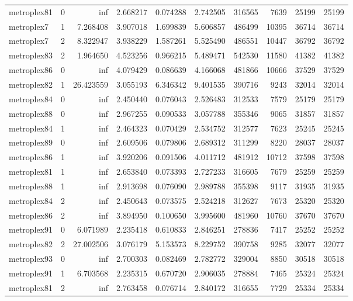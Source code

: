 \begin{longtable}{|l|r|r|r|r|r|r|r|r|r|}
metroplex81 & 0 & inf & 2.668217 & 0.074288 & 2.742505 & 316565 & 7639 & 25199 & 25199 \\
metroplex7 & 1 & 7.268408 & 3.907018 & 1.699839 & 5.606857 & 486499 & 10395 & 36714 & 36714 \\
metroplex7 & 2 & 8.322947 & 3.938229 & 1.587261 & 5.525490 & 486551 & 10447 & 36792 & 36792 \\
metroplex83 & 2 & 1.964650 & 4.523256 & 0.966215 & 5.489471 & 542530 & 11580 & 41382 & 41382 \\
metroplex86 & 0 & inf & 4.079429 & 0.086639 & 4.166068 & 481866 & 10666 & 37529 & 37529 \\
metroplex82 & 1 & 26.423559 & 3.055193 & 6.346342 & 9.401535 & 390716 & 9243 & 32014 & 32014 \\
metroplex84 & 0 & inf & 2.450440 & 0.076043 & 2.526483 & 312533 & 7579 & 25179 & 25179 \\
metroplex88 & 0 & inf & 2.967255 & 0.090533 & 3.057788 & 355346 & 9065 & 31857 & 31857 \\
metroplex84 & 1 & inf & 2.464323 & 0.070429 & 2.534752 & 312577 & 7623 & 25245 & 25245 \\
metroplex89 & 0 & inf & 2.609506 & 0.079806 & 2.689312 & 311299 & 8220 & 28037 & 28037 \\
metroplex86 & 1 & inf & 3.920206 & 0.091506 & 4.011712 & 481912 & 10712 & 37598 & 37598 \\
metroplex81 & 1 & inf & 2.653840 & 0.073393 & 2.727233 & 316605 & 7679 & 25259 & 25259 \\
metroplex88 & 1 & inf & 2.913698 & 0.076090 & 2.989788 & 355398 & 9117 & 31935 & 31935 \\
metroplex84 & 2 & inf & 2.450643 & 0.073575 & 2.524218 & 312627 & 7673 & 25320 & 25320 \\
metroplex86 & 2 & inf & 3.894950 & 0.100650 & 3.995600 & 481960 & 10760 & 37670 & 37670 \\
metroplex91 & 0 & 6.071989 & 2.235418 & 0.610833 & 2.846251 & 278836 & 7417 & 25252 & 25252 \\
metroplex82 & 2 & 27.002506 & 3.076179 & 5.153573 & 8.229752 & 390758 & 9285 & 32077 & 32077 \\
metroplex93 & 0 & inf & 2.700303 & 0.082469 & 2.782772 & 329004 & 8850 & 30518 & 30518 \\
metroplex91 & 1 & 6.703568 & 2.235315 & 0.670720 & 2.906035 & 278884 & 7465 & 25324 & 25324 \\
metroplex81 & 2 & inf & 2.763458 & 0.076714 & 2.840172 & 316655 & 7729 & 25334 & 25334 \\

\end{longtable}
